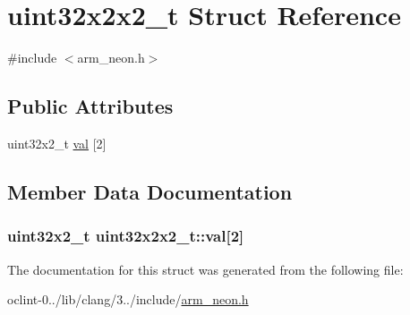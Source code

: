 \hypertarget{structuint32x2x2__t}{\section{uint32x2x2\-\_\-t Struct Reference}
\label{structuint32x2x2__t}
}


{\ttfamily \#include $<$arm\-\_\-neon.\-h$>$}

\subsection*{Public Attributes}
\begin{DoxyCompactItemize}
\item 
uint32x2\-\_\-t \hyperlink{structuint32x2x2__t_af1d57ad944319515fe7e3aa820396774}{val} \mbox{[}2\mbox{]}
\end{DoxyCompactItemize}


\subsection{Member Data Documentation}
\hypertarget{structuint32x2x2__t_af1d57ad944319515fe7e3aa820396774}{
\subsubsection[{val}]{\setlength{\rightskip}{0pt plus 5cm}uint32x2\-\_\-t uint32x2x2\-\_\-t\-::val\mbox{[}2\mbox{]}}}\label{structuint32x2x2__t_af1d57ad944319515fe7e3aa820396774}


The documentation for this struct was generated from the following file\-:\begin{DoxyCompactItemize}
\item 
oclint-\/0../lib/clang/3../include/\hyperlink{arm__neon_8h}{arm\-\_\-neon.\-h}\end{DoxyCompactItemize}
